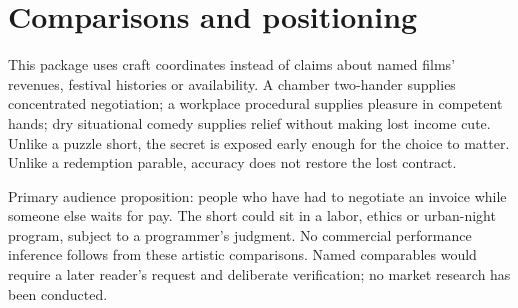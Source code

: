 \section{Comparisons and positioning}
This package uses craft coordinates instead of claims about named films' revenues, festival histories or availability. A chamber two-hander supplies concentrated negotiation; a workplace procedural supplies pleasure in competent hands; dry situational comedy supplies relief without making lost income cute. Unlike a puzzle short, the secret is exposed early enough for the choice to matter. Unlike a redemption parable, accuracy does not restore the lost contract.

Primary audience proposition: people who have had to negotiate an invoice while someone else waits for pay. The short could sit in a labor, ethics or urban-night program, subject to a programmer's judgment. No commercial performance inference follows from these artistic comparisons. Named comparables would require a later reader's request and deliberate verification; no market research has been conducted.
